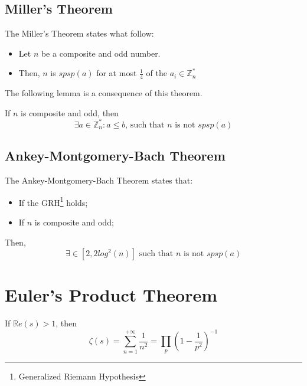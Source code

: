 \subsection{Miller's Theorem}
\begin{theorem}
    The Miller's Theorem states what follow:
    \begin{itemize}
        \item Let $n$ be a composite and odd number.
        \item Then, $n$ is $spsp(a)$ for at most $\frac{1}{4}$ of the $a_{i} \in \mathbb{Z}_{n}^{*}$
    \end{itemize}
\end{theorem}
The following lemma is a consequence of this theorem.
\begin{lemma}
    If $n$ is composite and odd, then \[\exists a \in \mathbb{Z}_{n}^{*}: a \leq b \text{, such that $n$ is not $spsp(a)$} \]
\end{lemma}

\subsection{Ankey-Montgomery-Bach Theorem}
\begin{theorem}
    The Ankey-Montgomery-Bach Theorem states that:
    \begin{itemize}
        \item If the GRH\footnote{Generalized Riemann Hypothesis} holds;
        \item If $n$ is composite and odd;
    \end{itemize}
    Then, \[\exists \in [2, 2 log^{2}(n)] \text{ such that $n$ is not $spsp(a)$}\]
\end{theorem}

\section{Euler's Product Theorem}
\begin{theorem}
    If $ \mathbb{R}e(s) > 1$, then \[\zeta(s) = \sum_{n = 1}^{+ \infty} \frac{1}{n^{2}} = \prod\limits_{p}(1 - \frac{1}{p^{2}})^{-1}\]
\end{theorem}
